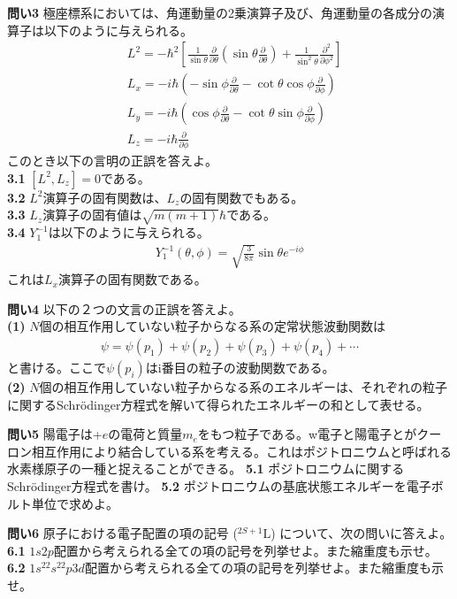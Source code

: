 \documentclass[11pt,pra,aps]{revtex4}
\begin{document}
\noindent
{\bf 問い3} 極座標系においては、角運動量の2乗演算子及び、角運動量の各成分の演算子は以下のように与えられる。
\begin{align}
  &L^2 = -\hbar^2\left[\frac{1}{\sin\theta}\frac{\partial}{\partial\theta}\left(\sin\theta\frac{\partial}{\partial\theta}\right)+\frac{1}{\sin^2\theta}\frac{\partial^2}{\partial\phi^2}\right]\\
  &L_x = -i\hbar\left(-\sin\phi\frac{\partial}{\partial \theta}-\cot\theta\cos\phi\frac{\partial}{\partial\phi}\right)\\
  &L_y = -i\hbar\left(\cos\phi\frac{\partial}{\partial \theta}-\cot\theta\sin\phi\frac{\partial}{\partial\phi}\right)\\    
  &L_z = -i\hbar\frac{\partial}{\partial \phi}
\end{align}
このとき以下の言明の正誤を答えよ。\\
\noindent
{\bf 3.1} $[L^2,L_z]=0$である。\\
\noindent    
{\bf 3.2} $L^2$演算子の固有関数は、$L_z$の固有関数でもある。\\
\noindent        
{\bf 3.3} $L_z$演算子の固有値は$\sqrt{m(m+1)}\hbar$である。\\
\noindent
{\bf 3.4} $Y^{-1}_1$は以下のように与えられる。
\begin{align}
  Y^{-1}_1(\theta,\phi)=\sqrt{\frac{3}{8\pi}}\sin\theta e^{-i\phi}
\end{align}
これは$L_x$演算子の固有関数である。

\noindent
{\bf 問い4} 以下の２つの文言の正誤を答えよ。\\
\noindent
{\bf (1)} $N$個の相互作用していない粒子からなる系の定常状態波動関数は
\begin{align}
  \psi = \psi(p_1) + \psi(p_2) + \psi(p_3) + \psi(p_4) + \cdots
\end{align}
と書ける。ここで$\psi(p_i)$はi番目の粒子の波動関数である。\\
\noindent
{\bf (2)} $N$個の相互作用していない粒子からなる系のエネルギーは、それぞれの粒子に関するSchr\"odinger方程式を解いて得られたエネルギーの和として表せる。

\noindent
{\bf 問い5} 陽電子は+$e$の電荷と質量$m_e$をもつ粒子である。w電子と陽電子とがクーロン相互作用により結合している系を考える。これはポジトロニウムと呼ばれる水素様原子の一種と捉えることができる。
\noindent
{\bf 5.1} ポジトロニウムに関するSchr\"odinger方程式を書け。
\noindent
{\bf 5.2} ポジトロニウムの基底状態エネルギーを電子ボルト単位で求めよ。

\noindent
{\bf 問い6} 原子における電子配置の項の記号 (${}^{2S+1}\text{L}$) について、次の問いに答えよ。\\
\noindent
{\bf 6.1} $1s2p$配置から考えられる全ての項の記号を列挙せよ。また縮重度も示せ。\\
\noindent
{\bf 6.2} $1s^22s^22p3d$配置から考えられる全ての項の記号を列挙せよ。また縮重度も示せ。
    
\end{document}
